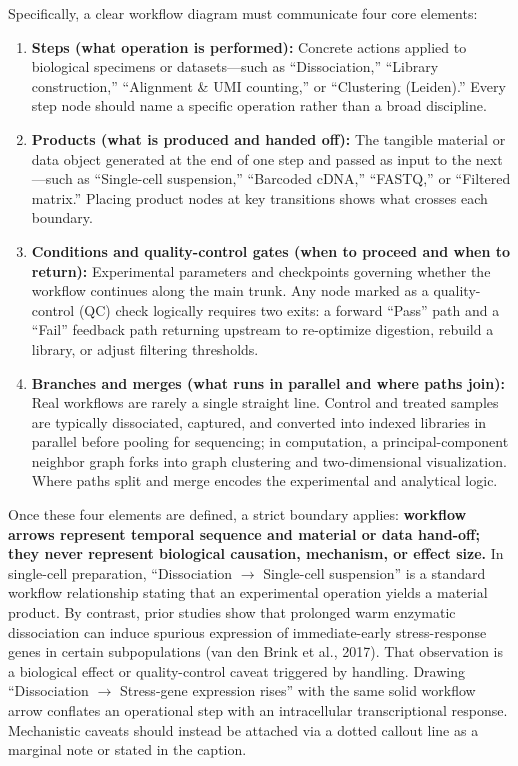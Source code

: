 Specifically, a clear workflow diagram must communicate four core elements:
\begin{enumerate}
\item \textbf{Steps (what operation is performed):} Concrete actions applied to biological specimens or datasets—such as ``Dissociation,'' ``Library construction,'' ``Alignment \& UMI counting,'' or ``Clustering (Leiden).'' Every step node should name a specific operation rather than a broad discipline.
\item \textbf{Products (what is produced and handed off):} The tangible material or data object generated at the end of one step and passed as input to the next—such as ``Single-cell suspension,'' ``Barcoded cDNA,'' ``FASTQ,'' or ``Filtered matrix.'' Placing product nodes at key transitions shows what crosses each boundary.
\item \textbf{Conditions and quality-control gates (when to proceed and when to return):} Experimental parameters and checkpoints governing whether the workflow continues along the main trunk. Any node marked as a quality-control (QC) check logically requires two exits: a forward ``Pass'' path and a ``Fail'' feedback path returning upstream to re-optimize digestion, rebuild a library, or adjust filtering thresholds.
\item \textbf{Branches and merges (what runs in parallel and where paths join):} Real workflows are rarely a single straight line. Control and treated samples are typically dissociated, captured, and converted into indexed libraries in parallel before pooling for sequencing; in computation, a principal-component neighbor graph forks into graph clustering and two-dimensional visualization. Where paths split and merge encodes the experimental and analytical logic.
\end{enumerate}

Once these four elements are defined, a strict boundary applies: \textbf{workflow arrows represent temporal sequence and material or data hand-off; they never represent biological causation, mechanism, or effect size.} In single-cell preparation, ``Dissociation $\rightarrow$ Single-cell suspension'' is a standard workflow relationship stating that an experimental operation yields a material product. By contrast, prior studies show that prolonged warm enzymatic dissociation can induce spurious expression of immediate-early stress-response genes in certain subpopulations (van den Brink et al., 2017). That observation is a biological effect or quality-control caveat triggered by handling. Drawing ``Dissociation $\rightarrow$ Stress-gene expression rises'' with the same solid workflow arrow conflates an operational step with an intracellular transcriptional response. Mechanistic caveats should instead be attached via a dotted callout line as a marginal note or stated in the caption.

